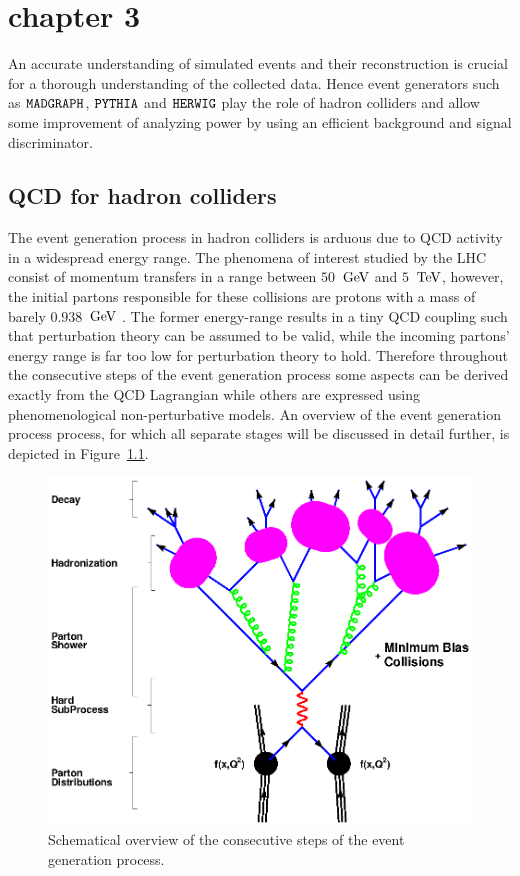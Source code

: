 \chapter{chapter 3} \label{chp:labelTitle}

An accurate understanding of simulated events and their reconstruction is crucial for a thorough understanding of the collected data. Hence event generators such as $\texttt{MADGRAPH}$, $\texttt{PYTHIA}$ and $\texttt{HERWIG}$ play the role of hadron colliders and allow some improvement of analyzing power by using an efficient background and signal discriminator.

\section{QCD for hadron colliders} \label{sec::QCDHadron}

The event generation process in hadron colliders is arduous due to QCD activity in a widespread energy range. The phenomena of interest studied by the LHC consist of momentum transfers in a range between $50$ $\, \mathrm{GeV}$ and $5$ $\, \mathrm{TeV}$, however, the initial partons responsible for these collisions are protons with a mass of barely $0.938$ $\, \mathrm{GeV}$ \cite{}. The former energy-range results in a tiny QCD coupling such that perturbation theory can be assumed to be valid, while the incoming partons' energy range is far too low for perturbation theory to hold. Therefore throughout the consecutive steps of the event generation process some aspects can be derived exactly from the QCD Lagrangian while others are expressed using phenomenological non-perturbative models. An overview of the event generation process process, for which all separate stages will be discussed in detail further, is depicted in Figure~\ref{fig::EvtShower}.

\begin{figure}[htb]
 \centering
 \includegraphics[width = 0.8 \textwidth]{Chapters/Chapter3/Figures/f_shg_event.eps}
 \caption{Schematical overview of the consecutive steps of the event generation process.}  \label{fig::EvtShower}
\end{figure}

